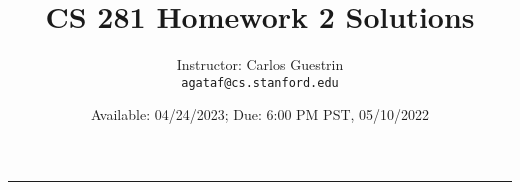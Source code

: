 \documentclass{article}
\title{CS 281 Homework 2 \ifanswers Solutions\fi}
\author{Instructor: Carlos Guestrin \\ \texttt{agataf@cs.stanford.edu}}
\date{Available: 04/24/2023; Due: 6:00 PM PST, 05/10/2022}
\begin{document}
\maketitle
\vspace{-0.3in}

\rule{\linewidth}{0.4pt}

%
\end{document}
